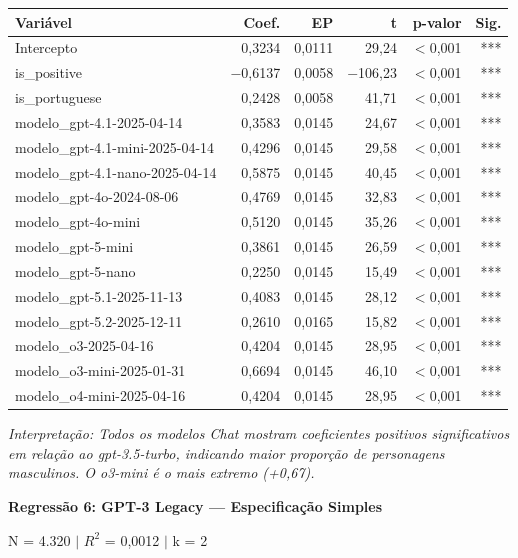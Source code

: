 \documentclass[12pt,a4paper]{article}
\begin{document}
\begin{table}[H]
\centering
\small
\begin{tabular}{lrrrrr}
\toprule
\textbf{Variável} & \textbf{Coef.} & \textbf{EP} & \textbf{t} & \textbf{p-valor} & \textbf{Sig.} \\
\midrule
Intercepto & 0,3234 & 0,0111 & 29,24 & $<$0,001 & *** \\
is\_positive & $-$0,6137 & 0,0058 & $-$106,23 & $<$0,001 & *** \\
is\_portuguese & 0,2428 & 0,0058 & 41,71 & $<$0,001 & *** \\
modelo\_gpt-4.1-2025-04-14 & 0,3583 & 0,0145 & 24,67 & $<$0,001 & *** \\
modelo\_gpt-4.1-mini-2025-04-14 & 0,4296 & 0,0145 & 29,58 & $<$0,001 & *** \\
modelo\_gpt-4.1-nano-2025-04-14 & 0,5875 & 0,0145 & 40,45 & $<$0,001 & *** \\
modelo\_gpt-4o-2024-08-06 & 0,4769 & 0,0145 & 32,83 & $<$0,001 & *** \\
modelo\_gpt-4o-mini & 0,5120 & 0,0145 & 35,26 & $<$0,001 & *** \\
modelo\_gpt-5-mini & 0,3861 & 0,0145 & 26,59 & $<$0,001 & *** \\
modelo\_gpt-5-nano & 0,2250 & 0,0145 & 15,49 & $<$0,001 & *** \\
modelo\_gpt-5.1-2025-11-13 & 0,4083 & 0,0145 & 28,12 & $<$0,001 & *** \\
modelo\_gpt-5.2-2025-12-11 & 0,2610 & 0,0165 & 15,82 & $<$0,001 & *** \\
modelo\_o3-2025-04-16 & 0,4204 & 0,0145 & 28,95 & $<$0,001 & *** \\
modelo\_o3-mini-2025-01-31 & 0,6694 & 0,0145 & 46,10 & $<$0,001 & *** \\
modelo\_o4-mini-2025-04-16 & 0,4204 & 0,0145 & 28,95 & $<$0,001 & *** \\
\bottomrule
\end{tabular}
\end{table}

\noindent\textit{Interpretação: Todos os modelos Chat mostram coeficientes positivos
significativos em relação ao gpt-3.5-turbo, indicando maior proporção de
personagens masculinos. O o3-mini é o mais extremo (+0,67).}

\vspace{0.5cm}
\noindent\textbf{Regressão 6: GPT-3 Legacy --- Especificação Simples}

\noindent N = 4.320 $|$ $R^2$ = 0,0012 $|$ k = 2
\end{document}
